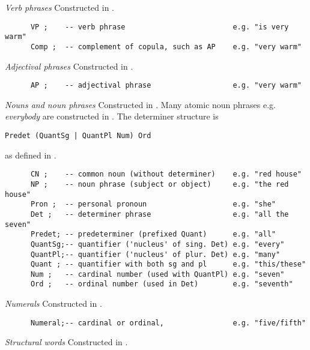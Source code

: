 \documentclass[11pt,a4paper]{article}
\newcommand{\subsubsubsection}[1]{\textit{#1}}
\begin{document}
\subsubsubsection{Verb phrases}
Constructed in .

\begin{verbatim}
      VP ;    -- verb phrase                         e.g. "is very warm"
      Comp ;  -- complement of copula, such as AP    e.g. "very warm"
\end{verbatim}

\subsubsubsection{Adjectival phrases}
Constructed in .

\begin{verbatim}
      AP ;    -- adjectival phrase                   e.g. "very warm"
\end{verbatim}

\subsubsubsection{Nouns and noun phrases}
Constructed in . 
Many atomic noun phrases e.g. \textit{everybody}
are constructed in .
The determiner structure is

\begin{verbatim}
Predet (QuantSg | QuantPl Num) Ord
\end{verbatim}
as defined in .

\begin{verbatim}
      CN ;    -- common noun (without determiner)    e.g. "red house"
      NP ;    -- noun phrase (subject or object)     e.g. "the red house"
      Pron ;  -- personal pronoun                    e.g. "she"
      Det ;   -- determiner phrase                   e.g. "all the seven"
      Predet; -- predeterminer (prefixed Quant)      e.g. "all"
      QuantSg;-- quantifier ('nucleus' of sing. Det) e.g. "every"
      QuantPl;-- quantifier ('nucleus' of plur. Det) e.g. "many"
      Quant ; -- quantifier with both sg and pl      e.g. "this/these"
      Num ;   -- cardinal number (used with QuantPl) e.g. "seven"
      Ord ;   -- ordinal number (used in Det)        e.g. "seventh"
\end{verbatim}

\subsubsubsection{Numerals}
Constructed in .

\begin{verbatim}
      Numeral;-- cardinal or ordinal,                e.g. "five/fifth"
\end{verbatim}

\subsubsubsection{Structural words}
Constructed in .
\end{document}
